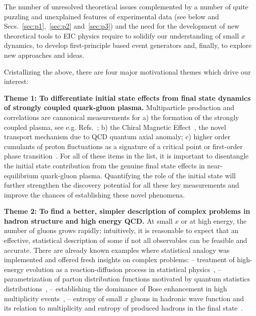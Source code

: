 
The number of unresolved theoretical issues complemented by a number of 
quite puzzling and unexplained features of experimental data (see below and  Secs.~\ref{sec:p1},~\ref{sec:p2} and~\ref{sec:p3})  
and the need for the development of new theoretical tools to EIC physics 
require to solidify our understanding of small $x$ dynamics, 
to develop first-principle based event generators and, finally, to  
explore new approaches and ideas. 



Cristallizing %
the above, there are four  major motivational themes which  drive our interest: 

\vspace{0.5em}

\noindent
{\bf Theme 1: 
To differentiate initial state effects from  final state dynamics of strongly coupled quark-gluon plasma. 
}
Multiparticle production and correlations are cannonical measurements for a) the formation of the strongly coupled 
plasma, see e.g. Refs.~\cite{Schafer:2009dj,Song:2010mg}; b) the Chiral Magnetic Effect~\cite{Kharzeev:2007jp}, the novel transport mechanism due to QCD quantum axial anomaly;
c) higher order cumulants of proton fluctuations as a signature of a critical point or first-order phase transition~\cite{Stephanov:2008qz}. 
For all of these items in the list, it is important to disentangle the initial state contribution from 
the genuine final state effects in near-equilibrium quark-gluon plasma. Quantifying the role of the initial state 
will further strengthen the discovery potential for all these key measurements and improve the chances of 
establishing these novel phenomena.   

\vspace{0.5em}

\noindent
{\bf Theme 2: 
	To find  a better, simpler description of complex problems in hadron structure and 
high energy QCD. 
}	 
At small $x$ or at high energy, the number of gluons grows rapidly; intuitively, it is  
reasonable to expect that an effective, statistical description of some if not all 
observables can be feasible and accurate. There are already known examples where 
statistical analogy  was implemented and offered fresh insights on complex problems: 
-- treatment of high-energy evolution as a reaction-diffusion process in statistical physics~\cite{Munier:2003vc,Iancu:2004es,Kutak:2011rb}, 
-- parametrization of parton distribution functions motivated by quantum statistics distributions~\cite{Mac:1989ki,Bhalerao:1996fc,Bourrely:2001du}, 
-- establishing the dominance of Bose enhancement in high multiplicity events~\cite{Kovner:2018azs}, 
-- entropy of small $x$ gluons in hadronic wave function and its relation to 
multiplicity and entropy of produced hadrons in the final state~\cite{Peschanski:2012cw,Kovner:2015hga,Kharzeev:2017qzs,Shuryak:2017phz,Hagiwara:2017uaz}.  


